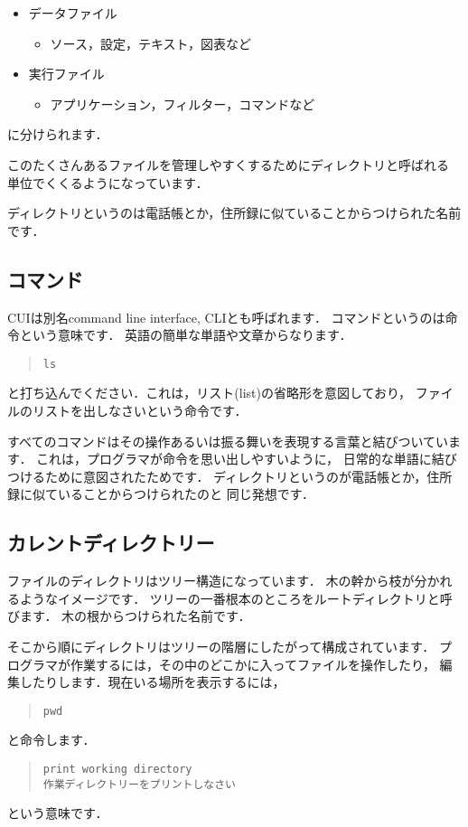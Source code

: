 \documentclass[12pt,a4paper]{jsarticle}
\begin{document}
\begin{itemize}
\item データファイル
\begin{itemize}
\item ソース，設定，テキスト，図表など
\end{itemize}
\item 実行ファイル
\begin{itemize}
\item アプリケーション，フィルター，コマンドなど
\end{itemize}
\end{itemize}
に分けられます．

このたくさんあるファイルを管理しやすくするためにディレクトリと呼ばれる
単位でくくるようになっています．

ディレクトリというのは電話帳とか，住所録に似ていることからつけられた名前です．

\subsection{コマンド}
CUIは別名command line interface, CLIとも呼ばれます．
コマンドというのは命令という意味です．
英語の簡単な単語や文章からなります．
\begin{quote}\begin{verbatim}
ls
\end{verbatim}\end{quote}
と打ち込んでください．これは，リスト(list)の省略形を意図しており，
ファイルのリストを出しなさいという命令です．

すべてのコマンドはその操作あるいは振る舞いを表現する言葉と結びついています．
これは，プログラマが命令を思い出しやすいように，
日常的な単語に結びつけるために意図されたためです．
ディレクトリというのが電話帳とか，住所録に似ていることからつけられたのと
同じ発想です．

\subsection{カレントディレクトリー}
ファイルのディレクトリはツリー構造になっています．
木の幹から枝が分かれるようなイメージです．
ツリーの一番根本のところをルートディレクトリと呼びます．
木の根からつけられた名前です．

そこから順にディレクトリはツリーの階層にしたがって構成されています．
プログラマが作業するには，その中のどこかに入ってファイルを操作したり，
編集したりします．現在いる場所を表示するには，
\begin{quote}\begin{verbatim}
pwd
\end{verbatim}\end{quote}
と命令します．
\begin{quote}\begin{verbatim}
print working directory
作業ディレクトリーをプリントしなさい
\end{verbatim}\end{quote}
という意味です．
\end{document}
